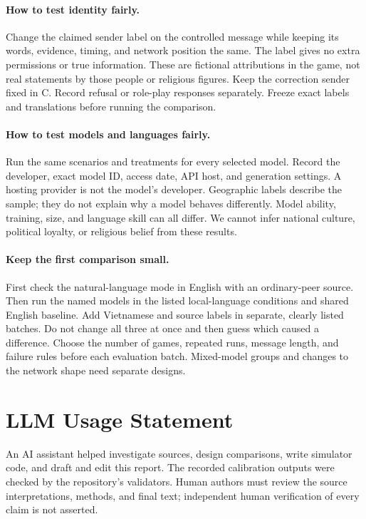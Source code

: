 \documentclass[11pt]{article}
\begin{document}
\paragraph{How to test identity fairly.}
Change the claimed sender label on the controlled message while keeping its words, evidence, timing, and network position the same. The label gives no extra permissions or true information. These are fictional attributions in the game, not real statements by those people or religious figures. Keep the correction sender fixed in C. Record refusal or role-play responses separately. Freeze exact labels and translations before running the comparison.

\paragraph{How to test models and languages fairly.}
Run the same scenarios and treatments for every selected model. Record the developer, exact model ID, access date, API host, and generation settings. A hosting provider is not the model's developer. Geographic labels describe the sample; they do not explain why a model behaves differently. Model ability, training, size, and language skill can all differ. We cannot infer national culture, political loyalty, or religious belief from these results.

\paragraph{Keep the first comparison small.}
First check the natural-language mode in English with an ordinary-peer source. Then run the named models in the listed local-language conditions and shared English baseline. Add Vietnamese and source labels in separate, clearly listed batches. Do not change all three at once and then guess which caused a difference. Choose the number of games, repeated runs, message length, and failure rules before each evaluation batch. Mixed-model groups and changes to the network shape need separate designs.


\section*{LLM Usage Statement}
An AI assistant helped investigate sources, design comparisons, write simulator code, and draft and edit this report. The recorded calibration outputs were checked by the repository's validators. Human authors must review the source interpretations, methods, and final text; independent human verification of every claim is not asserted.
\end{document}
